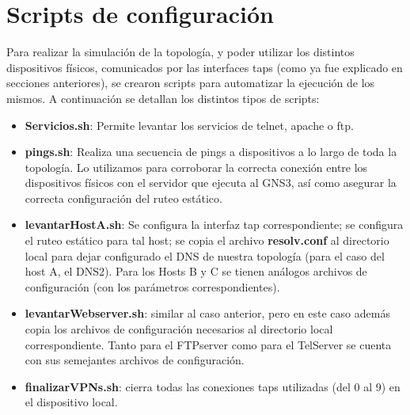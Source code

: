 \documentclass[12pt,a4paper,spanish]{article}
\begin{document}




\section{Scripts de configuración}
Para realizar la simulación de la topología, y poder utilizar los distintos dispositivos físicos, comunicados por las interfaces taps (como ya fue explicado en secciones anteriores), se crearon scripts para automatizar la ejecución de los mismos. A continuación se detallan los distintos tipos de scripts:
\begin{itemize}
	\item \textbf{Servicios.sh}: Permite levantar los servicios de telnet, apache o ftp.
	\item \textbf{pings.sh}: Realiza una secuencia de pings a dispositivos a lo largo de toda la topología. Lo utilizamos para corroborar la
		 correcta conexión entre los dispositivos físicos con el servidor que ejecuta al GNS3, así como asegurar la correcta configuración
		 del ruteo estático.
	\item \textbf{levantarHostA.sh}: Se configura la interfaz tap correspondiente; se configura el ruteo estático para tal host; se copia el 
		archivo \textbf{resolv.conf} al directorio local para dejar configurado el DNS de nuestra topología (para el caso del host A, el DNS2).
		Para los Hosts B y C se tienen análogos archivos de configuración (con los parámetros correspondientes).
	\item \textbf{levantarWebserver.sh}: similar al caso anterior, pero en este caso además copia los archivos de configuración necesarios al
		directorio local correspondiente. Tanto para el FTPserver como para el TelServer se cuenta con sus semejantes archivos de 
		configuración.
	\item \textbf{finalizarVPNs.sh}: cierra todas las conexiones taps utilizadas (del 0 al 9) en el dispositivo local.
\end{itemize}

\newpage

\end{document}

